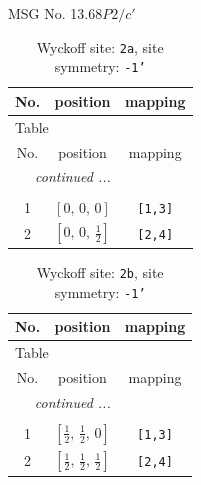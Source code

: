 \documentclass[fleqn,8pt]{jsarticle}
\begin{document}
\setcounter{MaxMatrixCols}{32}

\renewcommand{\tablename}{Table~}
\renewcommand{\figurename}{Figure~}
\begin{center}
\LARGE
MSG No. 13.68\quad$P2/c'$
\end{center}
\renewcommand{\arraystretch}{1.2}
\begin{longtable}{ccc}
\caption{Wyckoff site: {\tt 2a}, site symmetry: {\tt -1'}}
 \\
 \hline \hline
No. & position & mapping \\ \hline \endfirsthead

\multicolumn{2}{l}{\tablename\ \thetable{}} \\
 \hline \hline
No. & position & mapping \\ \hline \endhead

 \hline \hline
\multicolumn{2}{r}{\footnotesize\it continued ...} \\ \endfoot

 \hline \hline
\multicolumn{2}{r}{} \\ \endlastfoot

1 & $\left[ 0,\, 0,\, 0 \right]$ & {\tt [1,3]} \\ \hline
2 & $\left[ 0,\, 0,\, \frac{1}{2} \right]$ & {\tt [2,4]} \\
\end{longtable}
\renewcommand{\arraystretch}{1.2}
\begin{longtable}{ccc}
\caption{Wyckoff site: {\tt 2b}, site symmetry: {\tt -1'}}
 \\
 \hline \hline
No. & position & mapping \\ \hline \endfirsthead

\multicolumn{2}{l}{\tablename\ \thetable{}} \\
 \hline \hline
No. & position & mapping \\ \hline \endhead

 \hline \hline
\multicolumn{2}{r}{\footnotesize\it continued ...} \\ \endfoot

 \hline \hline
\multicolumn{2}{r}{} \\ \endlastfoot

1 & $\left[ \frac{1}{2},\, \frac{1}{2},\, 0 \right]$ & {\tt [1,3]} \\ \hline
2 & $\left[ \frac{1}{2},\, \frac{1}{2},\, \frac{1}{2} \right]$ & {\tt [2,4]} \\
\end{longtable}
\renewcommand{\arraystretch}{1.2}
\end{document}
